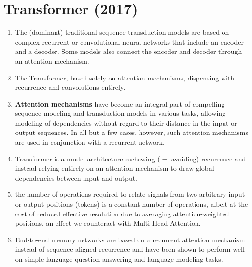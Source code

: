 \chapter{Transformer (2017)}

\begin{tcolorbox}
\end{tcolorbox}



\begin{enumerate}
    \item The (dominant) traditional sequence transduction models are based on complex recurrent or convolutional neural networks that include an encoder and a decoder.
    Some models also connect the encoder and decoder through an attention mechanism.
    \hfill \cite{arxiv/1706.03762/Attention-Is-All-You-Need}

    \item The Transformer, based solely on attention mechanisms, dispensing with recurrence and convolutions entirely. 
    \hfill \cite{arxiv/1706.03762/Attention-Is-All-You-Need}

    \item \textbf{Attention mechanisms} have become an integral part of compelling sequence modeling and transduction models in various tasks, allowing modeling of dependencies without regard to their distance in the input or output sequences.
    In all but a few cases, however, such attention mechanisms are used in conjunction with a recurrent network.
    \hfill \cite{arxiv/1706.03762/Attention-Is-All-You-Need}

    \item Transformer is a model architecture eschewing ($=$ avoiding) recurrence and instead relying entirely on an attention mechanism to draw global dependencies between input and output.
    \hfill \cite{arxiv/1706.03762/Attention-Is-All-You-Need}

    \item the number of operations required to relate signals from two arbitrary input or output positions (tokens) is a constant number of operations, albeit at the cost of reduced effective resolution due to averaging attention-weighted positions, an effect we counteract with Multi-Head Attention.
    \hfill \cite{arxiv/1706.03762/Attention-Is-All-You-Need}

    \item End-to-end memory networks are based on a recurrent attention mechanism instead of sequence-aligned recurrence and have been shown to perform well on simple-language question answering and language modeling tasks.
    \hfill \cite{arxiv/1706.03762/Attention-Is-All-You-Need}

\end{enumerate}






